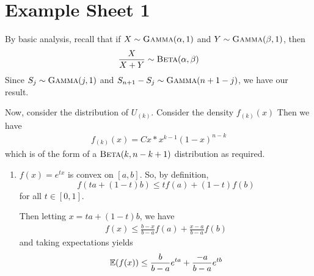 
\chapter{Example Sheet 1}
\label{cha:example-sheet-1}

\begin{exercises}
\item
  By basic analysis, recall that if $X \sim \textsc{Gamma}(\alpha, 1)$
  and $Y \sim \textsc{Gamma}(\beta, 1)$, then
  \begin{equation}
    \label{eq:1}
    \frac{X}{X+Y} \sim \textsc{Beta}(\alpha, \beta)
  \end{equation}
  Since $S_{j} \sim \textsc{Gamma}(j, 1)$ and $S_{n+1} - S_{j} \sim
  \textsc{Gamma}(n + 1 - j)$, we have our result.

  Now, consider the distribution of $U_{(k)}$.  Consider the density $f_{(k)}(x)$  Then we have
  \begin{align}
    \label{eq:2}
    f_{(k)}(x) = C x * x^{k-1} (1-x)^{n-k} 
  \end{align} which is of the form of a $\textsc{Beta}(k, n - k + 1)$
  distribution as required.
\item
  \begin{enumerate}
  \item $f(x) = e^{tx}$ is convex on $[a, b]$.  So, by definition,
    \begin{equation}
      \label{eq:3}
      f(ta + (1-t)b) \leq tf(a) + (1-t)f(b)
    \end{equation} for all $t \in [0, 1]$.

    Then letting $x = ta + (1-t)b$, we have
    \begin{align}
      \label{eq:4}
      f(x) \leq \frac{b-x}{b-a} f(a) + \frac{x-a}{b-a}f(b)
    \end{align} and taking expectations yields
    \begin{align}
      \label{eq:5}
      \E{f(x)} \leq \frac{b}{b-a}e^{ta} + \frac{-a}{b-a}e^{tb}
    \end{align}


\end{enumerate}
\end{exercises}
